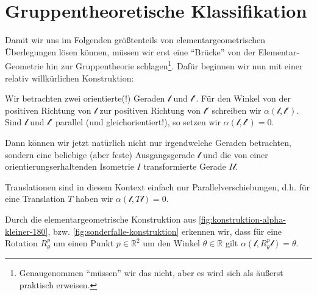 \documentclass[a4paper, ngerman]{article}
\numberwithin{equation}{chapter}
\theoremstyle{plain}
\theoremstyle{definition}
\begin{document}
\section{Gruppentheoretische Klassifikation}\label{sec:gruppentheo-klassifikation}
Damit wir uns im Folgenden größtenteils von elementargeometrischen Überlegungen lösen können, müssen wir erst eine "`Brücke"' von der Elementar-Geometrie hin zur Gruppentheorie schlagen\footnote{Genaugenommen "`müssen"' wir das nicht, aber es wird sich als äußerst praktisch erweisen.}. Dafür beginnen wir nun mit einer relativ willkürlichen Konstruktion:

Wir betrachten zwei orientierte(!) Geraden \(\mathscr l\) und \(\mathscr l'\). Für den Winkel von der positiven Richtung von \(\mathscr l\) zur positiven Richtung von \(\mathscr l'\) schreiben wir \(\alpha(\mathscr l, \mathscr l')\). Sind \(\mathscr l\) und \(\mathscr l'\) parallel (und gleichorientiert!), so setzen wir \(\alpha(\mathscr l, \mathscr l') = 0\). 

Dann können wir jetzt natürlich nicht nur irgendwelche Geraden betrachten, sondern eine beliebige (aber feste) Ausgangsgerade \(\mathscr l\) und die von einer orientierungserhaltenden Isometrie \(I\) transformierte Gerade \(I\mathscr l \). 

Translationen sind in diesem Kontext einfach nur Parallelverschiebungen, d.h. für eine Translation \(T\) haben wir \(\alpha(\mathscr l, T\mathscr l) = 0\). 

Durch die elementargeometrische Konstruktion aus \cref{fig:konstruktion-alpha-kleiner-180}, bzw. \cref{fig:sonderfalle-konstruktion} erkennen wir, dass für eine Rotation \(R_\theta^p\) um einen Punkt \(p\in \mathbb R^2\) um den Winkel \(\theta\in \mathbb R\) gilt \(\alpha(\mathscr l, R_\theta^p\mathscr l) = \theta\). 
\end{document}

